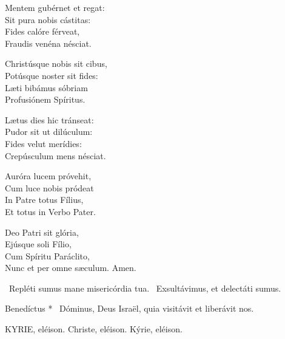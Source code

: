 Mentem gubérnet et regat:\\
Sit pura nobis cástitas:\\
Fides calóre férveat,\\
Fraudis venéna nésciat.

Christúsque nobis sit cibus,\\
Potúsque noster sit fides:\\
Læti bibámus sóbriam\\
Profusiónem Spíritus.

Lætus dies hic tránseat:\\
Pudor sit ut dilúculum:\\
Fides velut merídies:\\
Crepúsculum mens nésciat.

Auróra lucem próvehit,\\
Cum luce nobis pródeat\\
In Patre totus Fílius,\\
Et totus in Verbo Pater.

Deo Patri sit glória,\\
Ejúsque soli Fílio,\\
Cum Spíritu Paráclito,\\
Nunc et per omne sæculum. Amen.

\V\ Repléti sumus mane misericórdia tua. \R\ Exsultávimus, et delectáti sumus.

 Benedíctus * \textdagger\ Dóminus, Deus Israël, quia visitávit et liberávit nos.


KYRIE, eléison. Christe, eléison. Kýrie, eléison.

